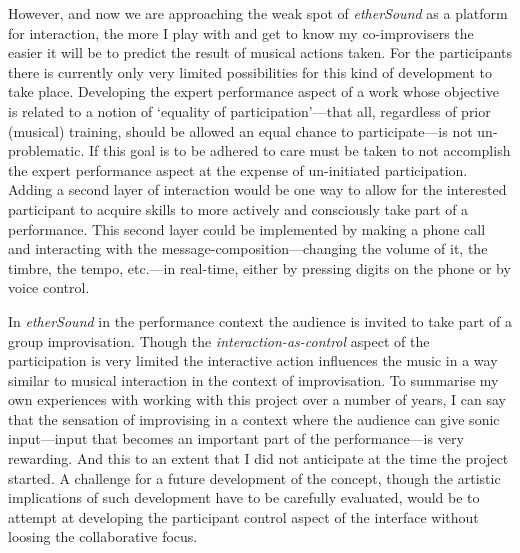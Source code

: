 However, and now we are approaching the weak spot of \emph{etherSound} as a platform for interaction, the more I play with and get to know my co-improvisers the easier it will be to predict the result of musical actions taken. For the participants there is currently only very limited possibilities for this kind of development to take place. Developing the expert performance aspect of a work whose objective is related to a notion of `equality of participation'---that all, regardless of prior (musical) training, should be allowed an equal chance to participate---is not un-problematic. If this goal is to be adhered to care must be taken to not accomplish the expert performance aspect at the expense of un-initiated participation. Adding a second layer of interaction would be one way to allow for the interested participant to acquire skills to more actively and consciously take part of a performance. This second layer could be implemented by making a phone call and interacting with the message-composition---changing the volume of it, the timbre, the tempo, etc.---in real-time, either by pressing digits on the phone or by voice control. 

In \emph{etherSound} in the performance context the audience is invited to take part of a group improvisation. Though the \emph{interaction-as-control} aspect of the participation is very limited the interactive action influences the music in a way similar to musical interaction in the context of improvisation. 
To summarise my own experiences with working with this project over a number of years, I can say that the sensation of improvising in a context where the audience can give sonic input---input that becomes an important part of the performance---is very rewarding. And this to an extent that I did not anticipate at the time the project started. A challenge for a future development of the concept, though the artistic implications of such development have to be carefully evaluated, would be to attempt at developing the participant control aspect of the interface without loosing the collaborative focus.


\newpage

